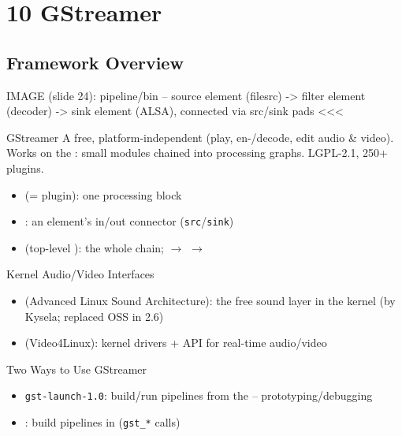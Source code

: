 \section{10 GStreamer}

\subsection{Framework Overview}

IMAGE (slide 24): pipeline/bin -- source element (filesrc) -> filter element (decoder) -> sink element (ALSA), connected via src/sink pads <<<

\begin{concept}{GStreamer}
    A free, platform-independent  (play, en-/decode,
    edit audio \& video). Works on the : small modules
    chained into processing graphs. LGPL-2.1, 250+ plugins.
    \begin{itemize}
        \item {} (= plugin): one processing block
        \item {}: an element's in/out connector (\texttt{src}/\texttt{sink})
        \item {} (top-level ): the whole chain;
               $\to$  $\to$ 
    \end{itemize}
\end{concept}


\begin{definition}{Kernel Audio/Video Interfaces}
    \begin{itemize}
        \item {} (Advanced Linux Sound Architecture): the free sound
              layer in the kernel (by Kysela; replaced OSS in 2.6)
        \item {} (Video4Linux): kernel drivers + API for real-time
              audio/video
    \end{itemize}
\end{definition}

\begin{definition}{Two Ways to Use GStreamer}
    \begin{itemize}
        \item \texttt{gst-launch-1.0}: build/run pipelines from the
               -- prototyping/debugging
        \item {}: build pipelines in 
              (\texttt{gst\_*} calls)
    \end{itemize}
\end{definition}

